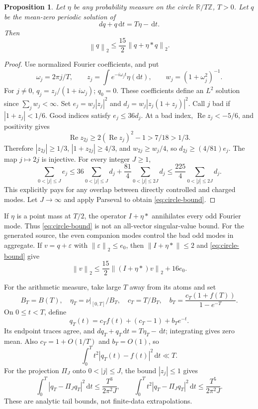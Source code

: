 \documentclass[11pt,letterpaper]{article}
\numberwithin{equation}{section}
\newtheorem{proposition}[theorem]{Proposition}
\theoremstyle{definition}
\theoremstyle{remark}
\newcommand{\R}{\mathbb R}
\newcommand{\dd}{\,\mathrm d}
\newcommand{\Rea}{\operatorname{Re}}
\newcommand{\norm}[1]{\left\lVert#1\right\rVert}
\begin{document}
\begin{proposition}\label{prop:circle}
Let $\eta$ be any probability measure on the circle $\R/T\mathbb Z$,
$T>0$. Let $q$ be the mean-zero periodic solution of
\[
 dq+q\dd t=T\eta-\dd t.
\]
Then
\begin{equation}\label{eq:circle-bound}
 \norm q_2\le\frac{15}{2}\norm{q+\eta*q}_2.
\end{equation}
\end{proposition}
\begin{proof}
Use normalized Fourier coefficients, and put
\[
 \omega_j=2\pi j/T,\qquad
 z_j=\int e^{-i\omega_jt}\eta(\mathrm dt),\qquad
 w_j=(1+\omega_j^2)^{-1}.
\]
For $j\ne0$, $q_j=z_j/(1+i\omega_j)$; $q_0=0$.
These coefficients define an $L^2$ solution since $\sum_jw_j<\infty$.
Set $e_j=w_j|z_j|^2$ and $d_j=w_j|z_j(1+z_j)|^2$.
Call $j$ bad if $|1+z_j|<1/6$. Good indices satisfy $e_j\le36d_j$.
At a bad index, $\Rea z_j<-5/6$, and positivity gives
\[
 \Rea z_{2j}\ge2(\Rea z_j)^2-1>7/18>1/3.
\]
Therefore $|z_{2j}|\ge1/3$, $|1+z_{2j}|\ge4/3$, and
$w_{2j}\ge w_j/4$, so $d_{2j}\ge(4/81)e_j$.
The map $j\mapsto2j$ is injective. For every integer $J\ge1$,
\[
 \sum_{0<|j|\le J}e_j
 \le36\sum_{0<|j|\le J}d_j+
       \frac{81}{4}\sum_{0<|j|\le2J}d_j
 \le\frac{225}{4}\sum_{0<|j|\le2J}d_j.
\]
This explicitly pays for any overlap between directly controlled and
charged modes. Let $J\to\infty$ and apply Parseval to obtain
\eqref{eq:circle-bound}.
\end{proof}

If $\eta$ is a point mass at $T/2$, the operator $I+\eta*$ annihilates
every odd Fourier mode. Thus \eqref{eq:circle-bound} is not an all-vector
singular-value bound. For the generated source, the even companion
modes control the bad odd modes in aggregate.
If $v=q+\varepsilon$ with $\norm\varepsilon_2\le e_0$, then
$\norm{I+\eta*}\le2$ and \eqref{eq:circle-bound} give
\[
 \norm v_2\le\frac{15}{2}\norm{(I+\eta*)v}_2+16e_0.
\]

For the arithmetic measure, take large $T$ away from its atoms and set
\[
 B_T=B(T),\quad \eta_T=\nu|_{[0,T]}/B_T,\quad
 c_T=T/B_T,\quad b_T=\frac{c_T(1+f(T))}{1-e^{-T}}.
\]
On $0\le t<T$, define
\begin{equation}\label{eq:circle-lift}
 q_T(t)=c_Tf(t)+(c_T-1)+b_Te^{-t}.
\end{equation}
Its endpoint traces agree, and
$dq_T+q_T\dd t=T\eta_T-\dd t$; integrating gives zero mean.
Also $c_T=1+O(1/T)$ and $b_T=O(1)$, so
\begin{equation}\label{eq:circle-lift-cost}
 \int_0^Tt^2|q_T(t)-f(t)|^2\dd t\ll T.
\end{equation}
For the projection $\Pi_J$ onto $0<|j|\le J$, the bound $|z_j|\le1$ gives
\[
 \int_0^T|q_T-\Pi_Jq_T|^2\dd t\le\frac{T^3}{2\pi^2J},\qquad
 \int_0^Tt^2|q_T-\Pi_Jq_T|^2\dd t\le\frac{T^5}{2\pi^2J}.
\]
These are analytic tail bounds, not finite-data extrapolations.
\end{document}
